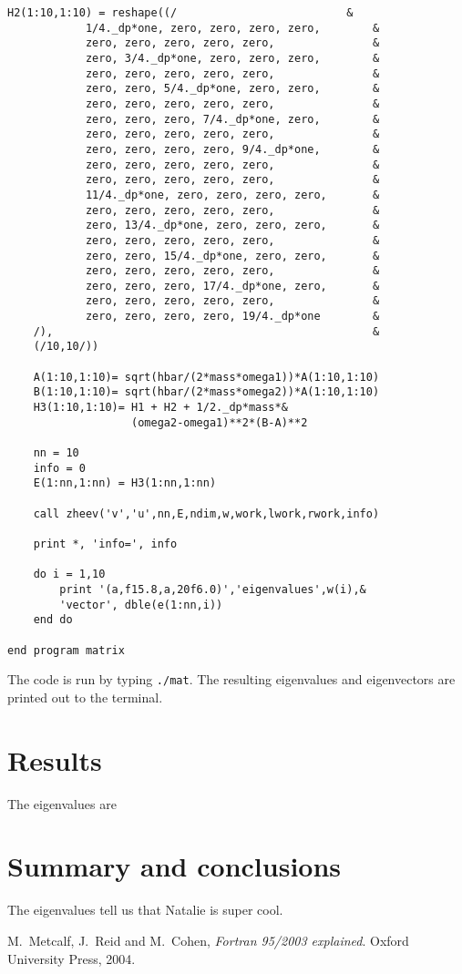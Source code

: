 \documentclass[12pt]{article}
\begin{document}
\begin{lstlisting}[frame=single,caption={ {\tt mtest.f95}},label=module]
	H2(1:10,1:10) = reshape((/							&
			1/4._dp*one, zero, zero, zero, zero,		&
			zero, zero, zero, zero, zero,				&
			zero, 3/4._dp*one, zero, zero, zero,		&
			zero, zero, zero, zero, zero,				&
			zero, zero, 5/4._dp*one, zero, zero,		&
			zero, zero, zero, zero, zero,				&
			zero, zero, zero, 7/4._dp*one, zero,		&
			zero, zero, zero, zero, zero,				&
			zero, zero, zero, zero, 9/4._dp*one,		&
			zero, zero, zero, zero, zero,				&
			zero, zero, zero, zero, zero,				&
			11/4._dp*one, zero, zero, zero, zero,		&
			zero, zero, zero, zero, zero,				&
			zero, 13/4._dp*one, zero, zero, zero,		&
			zero, zero, zero, zero, zero,				&
			zero, zero, 15/4._dp*one, zero, zero,		&
			zero, zero, zero, zero, zero,				&
			zero, zero, zero, 17/4._dp*one, zero,		&
			zero, zero, zero, zero, zero,				&
			zero, zero, zero, zero, 19/4._dp*one 		&
	/), 												&
	(/10,10/))

	A(1:10,1:10)= sqrt(hbar/(2*mass*omega1))*A(1:10,1:10)
	B(1:10,1:10)= sqrt(hbar/(2*mass*omega2))*A(1:10,1:10)
	H3(1:10,1:10)= H1 + H2 + 1/2._dp*mass*&
				   (omega2-omega1)**2*(B-A)**2

	nn = 10
	info = 0
	E(1:nn,1:nn) = H3(1:nn,1:nn)

	call zheev('v','u',nn,E,ndim,w,work,lwork,rwork,info)

	print *, 'info=', info

	do i = 1,10
		print '(a,f15.8,a,20f6.0)','eigenvalues',w(i),&
		'vector', dble(e(1:nn,i)) 
	end do

end program matrix

\end{lstlisting}



The code is run by typing {\tt ./mat}. The resulting eigenvalues and eigenvectors are printed out to the terminal.

\section{Results}

The eigenvalues are


\section{Summary and conclusions}

The eigenvalues tell us that Natalie is super cool. 

\begin{thebibliography}{}


 M.\ Metcalf, J.\ Reid and M.\ Cohen, {\it Fortran 95/2003 explained}. Oxford University Press, 2004.
 

\end{thebibliography}
\end{document}
